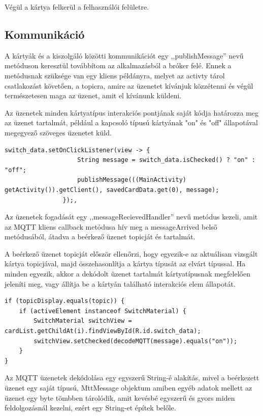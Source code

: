 \documentclass[
]{thesis-ekf}
\theoremstyle{definition}
\theoremstyle{remark}
\begin{document}
Végül a kártya felkerül a felhasználói felületre.

\subsection{Kommunikáció}
A kártyák és a kiszolgáló közötti kommunikációt egy ,,publishMessage'' nevű metóduson keresztül továbbítom
az alkalmazásból a bróker felé. Ennek a metódusnak szüksége van egy kliens példányra, melyet az activty tárol
csatlakozást követően, a topicra, amire az üzenetet kívánjuk közzétenni és végül természetesen maga az üzenet, amit
el kívánunk küldeni.

Az üzenetek minden kártyatípus interakciós pontjának saját kódja határozza meg az üzenet tartalmát, például
a kapcsoló típusú kártyának "on" és "off" állapotával megegyező szöveges üzenetet küld. 

\lstset{language=Java}
\begin{lstlisting}[frame=single]
switch_data.setOnClickListener(view -> {
                    String message = switch_data.isChecked() ? "on" : "off";
                    publishMessage(((MainActivity) getActivity()).getClient(), savedCardData.get(0), message);
                });,
\end{lstlisting}

Az üzenetek fogadását egy ,,messageRecievedHandler'' nevű metódus kezeli, amit az MQTT kliens callback metódusa
hív meg a messageArrived belső metódusából, átadva a beérkező üzenet topicját és tartalmát.

A beérkező üzenet topicját először ellenőrzi, hogy egyezik-e az aktuálisan vizsgált kártya topicjával, majd
összehasonlítja a kártya típusát az elvárt típussal. Ha minden egyezik, akkor a dekódolt üzenet tartalmát
kártyatípusnak megfelelően jeleníti meg, vagy állítja be a kártyán található interakciós elem állapotát.

\lstset{language=Java}
\begin{lstlisting}[frame=single]
if (topicDisplay.equals(topic)) {
	if (activeElement instanceof SwitchMaterial) {
		SwitchMaterial switchView = cardList.getChildAt(i).findViewById(R.id.switch_data);
		switchView.setChecked(decodeMQTT(message).equals("on"));
	}
}
\end{lstlisting}

Az MQTT üzenetek dekódolása egy egyszerű String-é alakítás, mivel a beérkezett üzenet egy saját típusú, MttMessage
objektum amiben egyéb adatok mellett az üzenet egy byte tömbben tárolódik, amit kevésbé egyszerű és gyors miden
feldolgozásnál kezelni, ezért egy String-et építek belőle.
\end{document}

